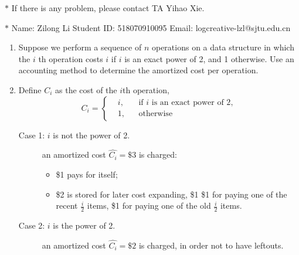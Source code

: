 \documentclass[12pt,a4paper]{article}
\makeatletter
\newtheorem*{solution}{Solution}
\theoremstyle{definition}
\renewenvironment{solution}[1][Solution] {\par\pushQED{\qed}\normalfont\topsep6\p@\@plus6\p@\relax\trivlist\item[\hskip\labelsep\bfseries#1\@addpunct{.}]\ignorespaces}{\popQED\endtrivlist\@endpefalse} \makeatother
\makeatother
\begin{document}
\noindent

\noindent{}
\begin{center}
\footnotesize{\color{red}$*$ If there is any problem, please contact TA Yihao Xie. }

\footnotesize{\color{blue}$*$ Name: Zilong Li  \quad Student ID: 518070910095 \quad Email: logcreative-lzl@sjtu.edu.cn}
\end{center}
\begin{enumerate}
	\item Suppose we perform a sequence of $n$ operations on a data structure in which the $i$ th operation costs $i$ if $i$ is an exact power of 2, and 1 otherwise. Use an accounting method to determine the amortized cost per operation.
	
	\begin{solution}
		Define $C_i$ as the cost of the $i$th operation,
		\begin{equation*}
			C_i=\left\{\begin{aligned}
				&i, &&\text{if }i\text{ is an exact power of 2},\\
				&1, &&\text{otherwise}
			\end{aligned}\right.
		\end{equation*}
		\begin{description}
			\item[Case 1: $i$ is not the power of 2.] an amortized cost $\hat{C_i}=\$3$ is charged:
			\begin{itemize}
				\item \$1 pays for itself;
				\item \$2 is stored for later cost expanding, \$1 \$1 for paying one of the recent $\frac{i}{2}$ items, \$1 for paying one of the old $\frac{i}{2}$ items.
			\end{itemize} 
			\item[Case 2: $i$ is the power of 2.]  an amortized cost $\hat{C_i}=\$2$ is charged, in order not to have leftouts.


\end{description}
\end{solution}
\end{enumerate}
\end{document}
